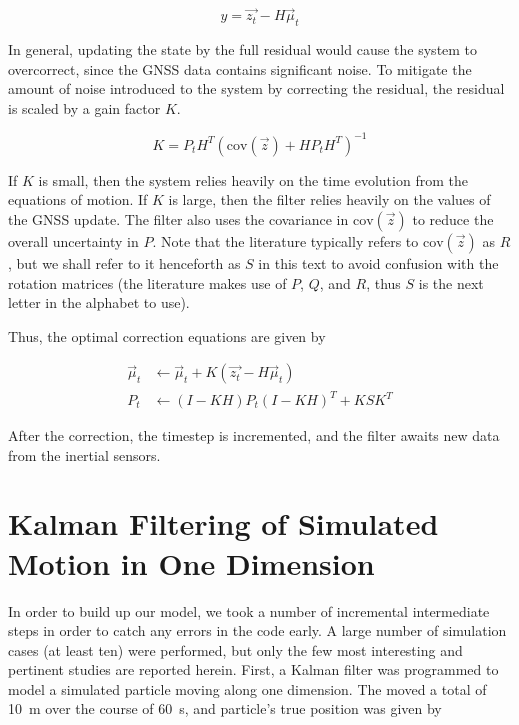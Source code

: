 \documentclass[10pt]{article}
\begin{document}
\begin{equation}
y = \vec{z_t} - H\vec{\mu}_t
\end{equation}

In general, updating the state by the full residual would cause the system to overcorrect, since the GNSS data contains significant noise. To mitigate the amount of noise introduced to the system by correcting the residual, the residual is scaled by a gain factor $K$. 

\begin{equation}
K = P_t H^T (\mathrm{cov}(\vec{z}) + H P_t H^T)^{-1}
\end{equation}

If $K$ is small, then the system relies heavily on the time evolution from the equations of motion. If $K$ is large, then the filter relies heavily on the values of the GNSS update. The filter also uses the covariance in $\mathrm{cov}(\vec{z})$ to reduce the overall uncertainty in $P$. Note that the literature typically refers to $\mathrm{cov}(\vec{z})$ as $R$, but we shall refer to it henceforth as $S$ in this text to avoid confusion with the rotation matrices (the literature makes use of $P$, $Q$, and $R$, thus $S$ is the next letter in the alphabet to use). 

Thus, the optimal correction equations are given by

\begin{align}
\vec{\mu}_t & \leftarrow \vec{\mu}_t + K (\vec{z_t} - H\vec{\mu}_t) \\
P_t & \leftarrow (I - KH) P_t (I - KH)^T + KSK^T
\end{align}

After the correction, the timestep is incremented, and the filter awaits new data from the inertial sensors.



\section{Kalman Filtering of Simulated Motion in One Dimension}

In order to build up our model, we took a number of incremental intermediate steps in order to catch any errors in the code early. A large number of simulation cases (at least ten) were performed, but only the few most interesting and pertinent studies are reported herein. First, a Kalman filter was programmed to model a simulated particle moving along one dimension. The moved a total of \SI{10}{m} over the course of \SI{60}{s}, and particle's true position was given by
\end{document}
